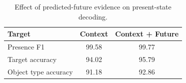 \begin{table}[t]
\centering
\caption{Effect of predicted-future evidence on present-state decoding.}
\label{tab:physion-future-semantics}
\small
\renewcommand{\arraystretch}{1.05}
\begin{tabularx}{0.70\linewidth}{@{}Lcc@{}}
\toprule\toprule
\textbf{Target} & \textbf{Context} & \textbf{Context + Future} \\
\midrule
Presence F1 & 99.58 & 99.77 \\
Target accuracy & 94.02 & 95.79 \\
Object type accuracy & 91.18 & 92.86 \\
\bottomrule\bottomrule
\end{tabularx}
\end{table}
